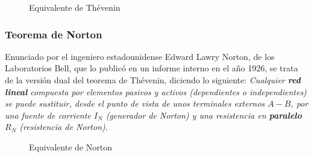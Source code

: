      \begin{figure}[H]
        \centering
        \hfil
        \caption{Equivalente de Thévenin}
        \label{fig.thevenin}
    \end{figure}
     
\subsubsection{Teorema de Norton}
Enunciado por el ingeniero estadounidense Edward Lawry Norton, de los Laboratorios Bell, que lo publicó en un informe interno en el año 1926, se trata de la versión dual del teorema de Thévenin, diciendo lo siguiente: \textit{Cualquier \textbf{red lineal} compuesta por elementos pasivos y activos (dependientes o independientes) se puede sustituir, desde el punto de vista de unos terminales externos $A-B$, por una fuente de corriente $I_{N}$ (generador de Norton) y una resistencia en \textbf{paralelo} $R_{N}$ (resistencia de Norton)}. 
\begin{figure}[H]
        \centering
        \hfil
        \caption{Equivalente de Norton}
        \label{fig.norton_continua}
    \end{figure}

